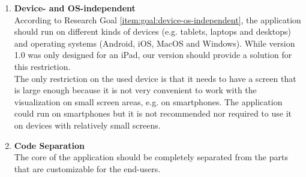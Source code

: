 \begin{enumerate}[label=\textbf{\arabic*}., ref=\arabic*]
	\item \textbf{Device- and OS-independent\label{item:device-os-independent}} \hfill \\
	According to Research Goal \ref{item:goal:device-os-independent}, the application should run on different kinds of devices (e.g. tablets, laptops and desktops) and operating systems (Android, iOS, MacOS and Windows). While version 1.0 was only designed for an iPad, our version should provide a solution for this restriction.\\
	The only restriction on the used device is that it needs to have a screen that is large enough because it is not very convenient to work with the visualization on small screen areas, e.g. on smartphones. The application could run on smartphones but it is not recommended nor required to use it on devices with relatively small screens.
	
	\item \textbf{Code Separation\label{item:code-separation}} \hfill \\
	The core of the application should be completely separated from the parts that are customizable for the end-users.

\end{enumerate}
